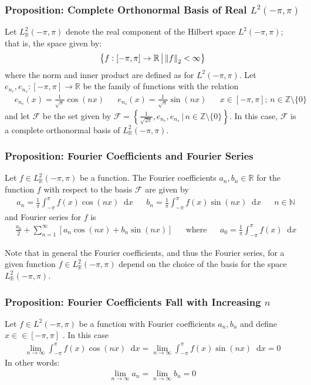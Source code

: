 \documentclass[11pt, a4paper]{article}
\newcommand{\diff}{\mathop{}\!\mathrm{d}} %
\newcommand{\R}{\mathbb{R}} %
\begin{document}
\subsubsection{Proposition: Complete Orthonormal Basis of Real $ L^2(-\pi, \pi) $}
Let $ L^2_{\R}(-\pi, \pi) $ denote the real component of the Hilbert space $ L^2(-\pi, \pi) $; that is, the space given by:
\begin{equation*}
	\left\{ f:[-\pi, \pi] \to \R \, \big | \, \norm{f}_2 < \infty \right\}
\end{equation*}
where the norm and inner product are defined as for $ L^2(-\pi, \pi) $. Let $ e_{n_c},  e_{n_s} : [-\pi , \pi] \to \R $ be the family of functions with the relation
\begin{align*}
	&e_{n_c}(x) = \frac{1}{\sqrt{\pi}} \cos(n x) && e_{n_s}(x) = \frac{1}{\sqrt{\pi}} \sin(n x) &&   x \in [-\pi, \pi]; \, n \in \mathbb{Z} \setminus \{0\}
\end{align*}
and let $ \mathcal{F} $ be the set given by $ \mathcal{F} = \left\{\frac{1}{\sqrt{2\pi}}, e_{n_c}, e_{n_s} \, \big | \, n \in \mathbb{Z} \setminus \{0\} \right\} $. In this case, $ \mathcal{F}  $ is a complete orthonormal basis of $  L^2_{\R}(-\pi, \pi)  $.

\subsubsection{Proposition: Fourier Coefficients and Fourier Series}
Let $ f \in  L^2_{\R}(-\pi, \pi)  $ be a function. The Fourier coefficients $ a_n, b_n \in \R $ for the function $ f $ with respect to the basis $ \mathcal{F} $ are given by
\begin{align*}
	&a_n = \frac{1}{\pi} \int_{-\pi}^{\pi} f(x) \cos(nx) \diff x && b_n = \frac{1}{\pi} \int_{-\pi}^{\pi} f(x) \sin(nx) \diff x && n \in \mathbb{N}
\end{align*}
and Fourier series for $ f $ is
\begin{align*}
	&\frac{a_0}{2} + \sum_{n = 1}^{\infty} \left[a_n \cos(nx) + b_n \sin(nx) \right] && \text{where} && a_0 = \frac{1}{\pi}\int_{-\pi}^{\pi} f(x) \diff x
\end{align*}


Note that in general the Fourier coefficients, and thus the Fourier series, for a given function $ f \in  L^2_{\R}(-\pi, \pi) $ depend on the choice of the basis for the space $  L^2_{\R}(-\pi, \pi) $.

\subsubsection{Proposition: Fourier Coefficients Fall with Increasing $ n $}
Let $ f \in L^2(-\pi, \pi) $ be a function with Fourier coefficients $ a_n, b_n $ and define $ x \in \in [-\pi, \pi] $ . In this case
\begin{align*}
	\lim_{n \to \infty} \int_{-\pi}^{\pi} f(x) \cos(nx) \diff x = \lim_{n \to \infty} \int_{-\pi}^{\pi} f(x) \sin(nx) \diff x = 0
\end{align*}
In other words:
\begin{align*}
	\lim_{n \to \infty}  a_n = \lim_{n \to \infty} b_n = 0
\end{align*}
\end{document}
